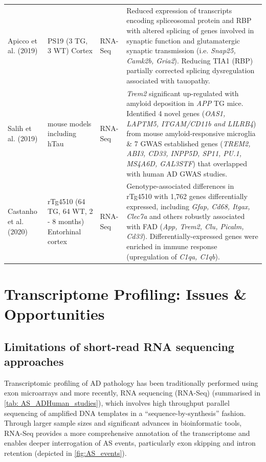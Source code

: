 \begin{landscape}
\begin{longtable}[c]{p{3cm}p{4cm}p{3cm}p{16cm}}
		\centering Apicco et al. (2019) \cite{Apicco2019} &
		\centering PS19 (3 TG, 3 WT) \newline Cortex &
		\centering RNA-Seq &
		\tabitem Reduced expression of transcripts encoding spliceosomal protein and RBP with altered splicing of genes involved in synaptic function and glutamatergic synaptic transmission (i.e. \textit{Snap25, Camk2b, Gria2}). \newline
		\tabitem Reducing TIA1 (RBP) partially corrected splicing dysregulation associated with tauopathy. \\
		\hdashline[0.5pt/5pt]
		
		\centering Salih et al. (2019) \cite{Salih2019} &
		\centering 5 mouse models including hTau   &
		\centering RNA-Seq &
		\tabitem \textit{Trem2} significant up-regulated with amyloid deposition in \textit{APP} TG mice. \newline
		\tabitem Identified 4 novel genes (\textit{OAS1, LAPTM5, ITGAM/CD11b and LILRB4}) from mouse amyloid-responsive microglia \& 7 GWAS established genes (\textit{TREM2, ABI3, CD33, INPP5D, SP11, PU.1, MS4A6D, GAL3STF}) that overlapped with human AD GWAS studies. \\
		\hdashline[0.5pt/5pt]
		
		\centering Castanho et al. (2020) \cite{Castanho2020} &
		\centering rTg4510 (64 TG, 64 WT, 2 - 8 months) \newline Entorhinal cortex &
		\centering RNA-Seq &
		\tabitem Genotype-associated differences in rTg4510 with 1,762 genes differentially expressed, including \textit{Gfap, Cd68, Itgax, Clec7a} and others robustly associated with FAD (\textit{App, Trem2, Clu, Picalm, Cd33}).  \newline
		\tabitem Differentially-expressed genes were enriched in immune response (upregulation of \textit{C1qa, C1qb}).\\* \bottomrule
	\end{longtable}
\end{landscape}
\restoregeometry


\section{Transcriptome Profiling: Issues \& Opportunities}
\subsection{Limitations of short-read RNA sequencing approaches}
\label{rnaseq_intro}
Transcriptomic profiling of AD pathology has been traditionally performed using exon microarrays and more recently, RNA sequencing (RNA-Seq) (summarised in \cref{tab: AS_ADHuman_studies}), which involves high throughput parallel sequencing of amplified DNA templates in a “sequence-by-synthesis” fashion. Through larger sample sizes and significant advances in bioinformatic tools, RNA-Seq provides a more comprehensive annotation of the transcriptome and enables deeper interrogation of AS events, particularly exon skipping and intron retention (depicted in \cref{fig:AS_events}). 

